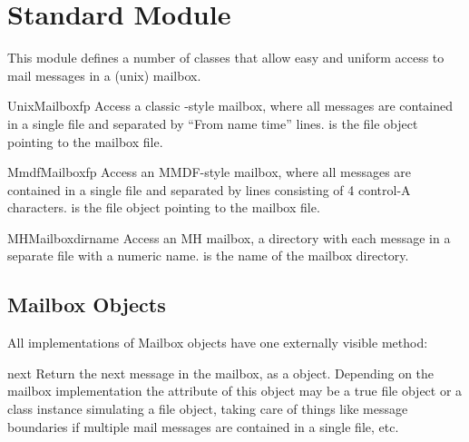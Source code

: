 \section{Standard Module }
\label{module-mailbox}

\renewcommand{\indexsubitem}{(in module mailbox)}

This module defines a number of classes that allow easy and uniform
access to mail messages in a (unix) mailbox.

\begin{funcdesc}{UnixMailbox}{fp}
Access a classic \UNIX{}-style mailbox, where all messages are contained
in a single file and separated by ``From name time'' lines. 
is the file object pointing to the mailbox file.
\end{funcdesc}

\begin{funcdesc}{MmdfMailbox}{fp}
Access an MMDF-style mailbox, where all messages are contained
in a single file and separated by lines consisting of 4 control-A
characters. 
is the file object pointing to the mailbox file.
\end{funcdesc}

\begin{funcdesc}{MHMailbox}{dirname}
Access an MH mailbox, a directory with each message in a separate
file with a numeric name. 
is the name of the mailbox directory.
\end{funcdesc}

\subsection{Mailbox Objects}

All implementations of Mailbox objects have one externally visible
method:

\begin{funcdesc}{next}{}
Return the next message in the mailbox, as a  object.
Depending on the mailbox implementation the  attribute of this
object may be a true file object or a class instance simulating a file object,
taking care of things like message boundaries if multiple mail messages are
contained in a single file, etc.
\end{funcdesc}


